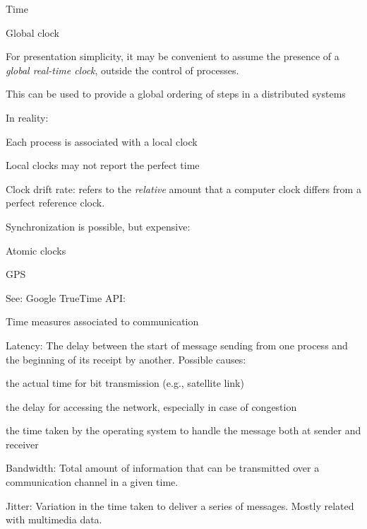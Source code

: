 \begin{frame}{Time}
\BIL
\item \alert{Global clock}
  \BI
  \item
  For presentation simplicity, it may be convenient to assume
  the presence of a {\em global real-time clock}, outside the control of processes.
  \item This can be used to provide a global ordering of steps in a distributed systems
  \EI
\item \alert{In reality}:
  \BI
  \item Each process is associated with a \alert{local clock}
  \item Local clocks may not report the perfect time
  \item \alert{Clock drift rate}: refers to the {\em relative} amount that a computer
    clock differs from a perfect reference clock.
  \EI
\item Synchronization is possible, but expensive:
  \BI
    \item Atomic clocks
    \item GPS
	\item See: Google TrueTime API:
  \EI
\EI


\end{frame}

\begin{frame}{Time measures associated to communication}

\BIL
\item \alert{Latency}: The delay between the start of message sending from one process and the
  beginning of its receipt by another. Possible causes:
  \BI
   \item the actual time for bit transmission (e.g., satellite link)
   \item the delay for accessing the network, especially in case
     of congestion
   \item the time taken by the operating system to handle the message
     both at sender and receiver
  \EI
\item \alert{Bandwidth}: Total amount of information that can be transmitted
  over a communication channel in a given time. 
\item \alert{Jitter}: Variation in the time taken to deliver a series of
  messages. Mostly related with multimedia data.
\EIL
\end{frame}


